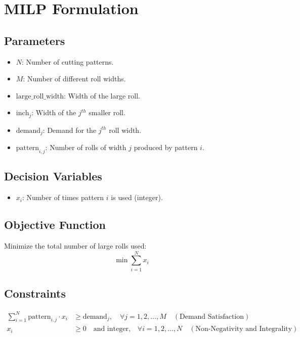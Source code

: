 \documentclass{article}
\begin{document}
\section*{MILP Formulation}

\subsection*{Parameters}
\begin{itemize}
    \item \( N \): Number of cutting patterns.
    \item \( M \): Number of different roll widths.
    \item \( \text{large\_roll\_width} \): Width of the large roll.
    \item \( \text{inch}_j \): Width of the \( j^{th} \) smaller roll.
    \item \( \text{demand}_j \): Demand for the \( j^{th} \) roll width.
    \item \( \text{pattern}_{i,j} \): Number of rolls of width \( j \) produced by pattern \( i \).
\end{itemize}

\subsection*{Decision Variables}
\begin{itemize}
    \item \( x_i \): Number of times pattern \( i \) is used (integer).
\end{itemize}

\subsection*{Objective Function}
Minimize the total number of large rolls used:
\[
\min \sum_{i=1}^{N} x_i
\]

\subsection*{Constraints}
\begin{align}
    \sum_{i=1}^{N} \text{pattern}_{i,j} \cdot x_i &\geq \text{demand}_j, \quad \forall j = 1, 2, \ldots, M \quad (\text{Demand Satisfaction})\\
    x_i &\geq 0 \quad \text{and integer,} \quad \forall i = 1, 2, \ldots, N \quad (\text{Non-Negativity and Integrality})
\end{align}
\end{document}

